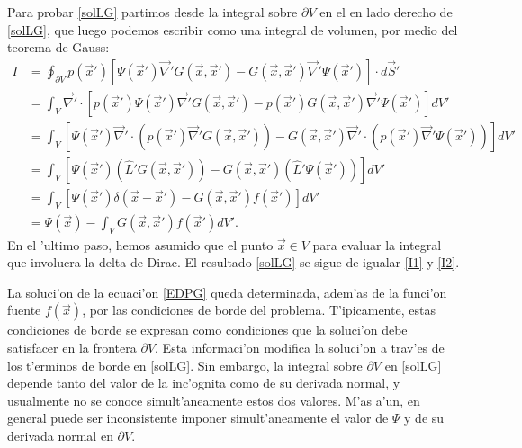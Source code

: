 Para probar \eqref{solLG} partimos desde la integral sobre $\partial V$ en el en lado derecho de \eqref{solLG}, que luego podemos escribir como una integral de volumen, por medio del teorema de Gauss:
\begin{align}
I &= \oint_{\partial V}p(\vec{x}')\left[\Psi(\vec{x}')\vec\nabla'G(\vec{x},\vec{x}')
-G(\vec{x},\vec{x}')\vec\nabla'\Psi(\vec{x}')\right]\cdot d\vec{S}' \label{I1}\\
&= \int_V\vec\nabla'\cdot\left[p(\vec{x}')\Psi(\vec{x}')\vec\nabla'G(\vec{x},\vec{x}')
-p(\vec{x}')G(\vec{x},\vec{x}')\vec\nabla'\Psi(\vec{x}')\right]dV' \\
&= \int_V\left[\Psi(\vec{x}')\vec\nabla'\cdot\left(p(\vec{x}')\vec\nabla' G(\vec{x},\vec{x}')\right) 
-G(\vec{x},\vec{x}')\vec\nabla'\cdot\left(p(\vec{x}')\vec\nabla'\Psi(\vec{x}')\right)\right]dV' \\
&= \int_V\left[\Psi(\vec{x}')\left(\hat{L}'G(\vec{x},\vec{x}')\right) 
-G(\vec{x},\vec{x}')\left(\hat{L}'\Psi(\vec{x}')\right)\right]dV' \\
&= \int_V\left[\Psi(\vec{x}')\delta(\vec{x}-\vec{x}')
-G(\vec{x},\vec{x}')f(\vec{x}')\right]dV' \\
&= \Psi(\vec{x})- \int_VG(\vec{x},\vec{x}')f(\vec{x}')dV'. \label{I2}
\end{align}
En el 'ultimo paso, hemos asumido que el punto $\vec{x}\in V$  para evaluar la integral que involucra la delta de Dirac. El resultado \eqref{solLG} se sigue de igualar \eqref{I1} y \eqref{I2}.

La soluci'on de la ecuaci'on \eqref{EDPG} queda determinada, adem'as de la funci'on fuente $f(\vec{x})$, por las condiciones de borde del problema. T'ipicamente, estas condiciones de borde se expresan como condiciones que la soluci'on debe satisfacer en la frontera $\partial V$. Esta informaci'on modifica la soluci'on a trav'es de los t'erminos de borde en \eqref{solLG}. Sin embargo, la integral sobre $\partial V$ en \eqref{solLG} depende tanto del valor de la inc'ognita como de su derivada normal, y usualmente no se conoce simult'aneamente estos dos valores. M'as a'un, en general puede ser inconsistente imponer simult'aneamente el valor de $\Psi$ y de su derivada normal en $\partial V$.

